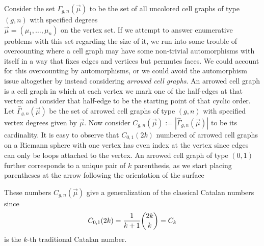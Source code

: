 \documentclass{amsart}
\newcommand{\be}{\begin{equation}}
\newcommand{\ee}{\end{equation}}
\theoremstyle{definition}
\begin{document}
Consider the set $\Gamma_{g,n}(\vec{\mu})$ to be the set of all uncolored cell graphs of type $(g,n)$ with specified degrees\\ $\vec{\mu}=(\mu_1,\ldots,\mu_n)$ on the vertex set. If we attempt to answer enumerative problems with this set regarding the size of it, we run into some trouble of overcounting where a cell graph may have some non-trivial automorphisms with itself in a way that fixes edges and vertices but permutes faces. We could account for this overcounting by automorphisms, or we could avoid the automorphism issue altogether by instead considering \textit{arrowed cell graphs}. An arrowed cell graph is a cell graph in which at each vertex we mark one of the half-edges at that vertex and consider that half-edge to be the starting point of that cyclic order. Let $\widehat{\Gamma}_{g,n}(\vec{\mu})$ be the set of arrowed cell graphs of type $(g,n)$ with specified vertex degrees given by $\vec{\mu}$. Now consider
$
C_{g,n}(\vec{\mu}):=|\widehat{\Gamma}_{g,n}(\vec{\mu})|$ to be its cardinality. 
It is easy to observe that $C_{0,1}(2k)$ numbered of arrowed cell graphs on a Riemann sphere with one vertex has even index at the vertex since edges can only be loops attached to the vertex. An arrowed cell graph of type $(0,1)$ further corresponds to a unique pair of $k$ parenthesis, as we start placing parentheses at the arrow  following the orientation of the surface

These numbers $C_{g,n}(\vec{\mu})$ give a generalization of the classical Catalan numbers since
\be\label{cat}
C_{0,1}(2k)=\dfrac{1}{k+1}\dbinom{2k}{k}=C_k
\ee
\noindent is the $k$-th traditional Catalan number.
\end{document}

